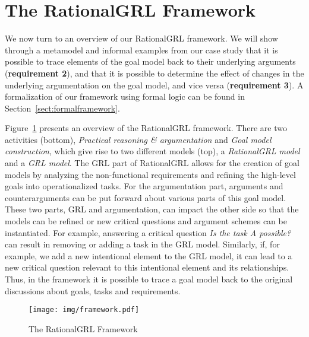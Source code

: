 \section{The RationalGRL Framework}
\label{sect:overview}

We now turn to an overview of our RationalGRL framework. We will show through a metamodel and informal examples from our case study that it is possible to trace elements of the goal model back to their underlying arguments (\textbf{requirement 2}), and that it is possible to determine the effect of changes in the underlying argumentation on the goal model, and vice versa (\textbf{requirement 3}). A formalization of our framework using formal logic can be found in Section~\ref{sect:formalframework}.

Figure~\ref{fig:rationalgrl-framework} presents an overview of the RationalGRL framework. There are two activities (bottom), \emph{Practical reasoning \& argumentation} and \emph{Goal model construction}, which give rise to two different models (top), a \emph{RationalGRL model} and a \emph{GRL model}. The GRL part of RationalGRL allows for the creation of goal models by analyzing the non-functional requirements and refining the high-level goals into operationalized tasks. For the argumentation part, arguments and counterarguments can be put forward about various parts of this goal model. These two parts, GRL and argumentation, can impact the other side so that the models can be refined or new critical questions and argument schemes can be instantiated. For example, answering a critical question \emph{Is the task \emph{A} possible?} can result in removing or adding a task in the GRL model. Similarly, if, for example, we add a new intentional element to the GRL model, it can lead to a new critical question relevant to this intentional element and its relationships. Thus, in the framework it is possible to trace a goal model back to the original discussions about goals, tasks and requirements. 

\begin{figure}[t]
\centering
\texttt{[image: img/framework.pdf]}
\caption{The RationalGRL Framework}
\label{fig:rationalgrl-framework}
\end{figure}

